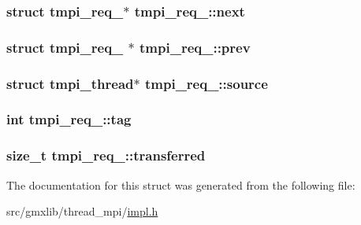\hypertarget{structtmpi__req___a9ddc799259f35f19bd76dc93d87520f6}{
\subsubsection[{next}]{\setlength{\rightskip}{0pt plus 5cm}struct {\bf tmpi\-\_\-req\-\_\-}$\ast$ {\bf tmpi\-\_\-req\-\_\-\-::next}}}\label{structtmpi__req___a9ddc799259f35f19bd76dc93d87520f6}
\hypertarget{structtmpi__req___a4b63333c8d9b3089190e830b2ca80709}{
\subsubsection[{prev}]{\setlength{\rightskip}{0pt plus 5cm}struct {\bf tmpi\-\_\-req\-\_\-} $\ast$ {\bf tmpi\-\_\-req\-\_\-\-::prev}}}\label{structtmpi__req___a4b63333c8d9b3089190e830b2ca80709}
\hypertarget{structtmpi__req___a66d282f8204b27bd11dde5655ba893bc}{
\subsubsection[{source}]{\setlength{\rightskip}{0pt plus 5cm}struct {\bf tmpi\-\_\-thread}$\ast$ {\bf tmpi\-\_\-req\-\_\-\-::source}}}\label{structtmpi__req___a66d282f8204b27bd11dde5655ba893bc}
\hypertarget{structtmpi__req___ad284068d6ea75f3fc069fb1a61d745a3}{
\subsubsection[{tag}]{\setlength{\rightskip}{0pt plus 5cm}int {\bf tmpi\-\_\-req\-\_\-\-::tag}}}\label{structtmpi__req___ad284068d6ea75f3fc069fb1a61d745a3}
\hypertarget{structtmpi__req___a479f9873547441132de60a7c45f84691}{
\subsubsection[{transferred}]{\setlength{\rightskip}{0pt plus 5cm}size\-\_\-t {\bf tmpi\-\_\-req\-\_\-\-::transferred}}}\label{structtmpi__req___a479f9873547441132de60a7c45f84691}


\-The documentation for this struct was generated from the following file\-:\begin{DoxyCompactItemize}
\item 
src/gmxlib/thread\-\_\-mpi/\hyperlink{impl_8h}{impl.\-h}\end{DoxyCompactItemize}

